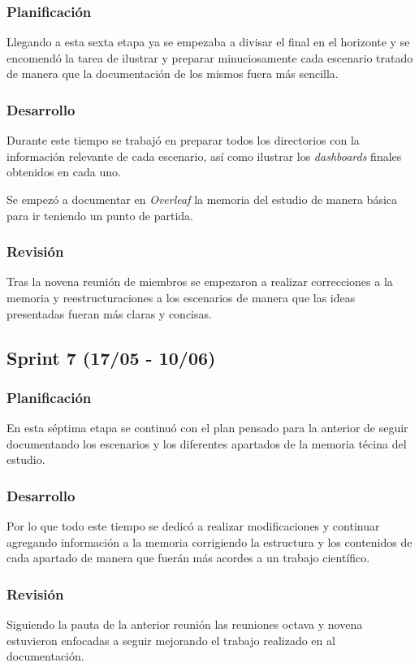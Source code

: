 \subsubsection{Planificación}
Llegando a esta sexta etapa ya se empezaba a divisar el final en el horizonte y se encomendó la tarea de ilustrar y preparar minuciosamente cada escenario tratado de manera que la documentación de los mismos fuera más sencilla.

\subsubsection{Desarrollo}
Durante este tiempo se trabajó en preparar todos los directorios con la información relevante de cada escenario, así como ilustrar los \textit{dashboards} finales obtenidos en cada uno.

Se empezó a documentar en \textit{Overleaf}  la memoria del estudio de manera básica para ir teniendo un punto de partida.

\subsubsection{Revisión}
Tras la novena reunión de miembros se empezaron a realizar correcciones a la memoria y reestructuraciones a los escenarios de manera que las ideas presentadas fueran más claras y concisas.

\subsection{Sprint 7 (17/05 - 10/06)}
\subsubsection{Planificación}
En esta séptima etapa se continuó con el plan pensado para la anterior de seguir documentando los escenarios y los diferentes apartados de la memoria técina del estudio.

\subsubsection{Desarrollo}
Por lo que todo este tiempo se dedicó a realizar modificaciones y continuar agregando información a la memoria corrigiendo la estructura y los contenidos de cada apartado de manera que fuerán más acordes a un trabajo científico.

\subsubsection{Revisión}
Siguiendo la pauta de la anterior reunión las reuniones octava y novena estuvieron enfocadas a seguir mejorando el trabajo realizado en al documentación.

